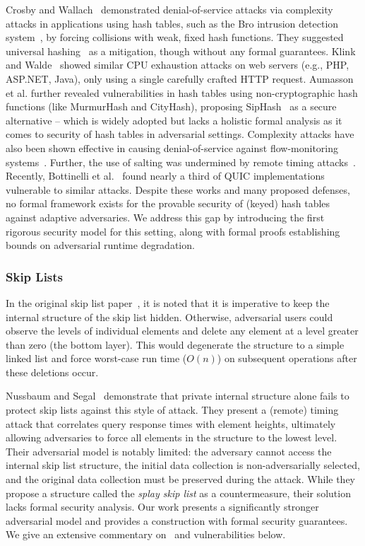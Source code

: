 Crosby and Wallach~\cite{CrosbyW03} demonstrated denial-of-service attacks via complexity attacks in applications using hash tables, such as the Bro intrusion detection system~\cite{paxson1999bro}, by forcing collisions with weak, fixed hash functions. They suggested universal hashing~\cite{carter1977universal} as a mitigation, though without any formal guarantees. Klink and Walde~\cite{klink2011efficient} showed similar CPU exhaustion attacks on web servers (e.g., PHP, ASP.NET, Java), only using a single carefully crafted HTTP request. Aumasson et al.\cite{aumasson2012hash} further revealed vulnerabilities in hash tables using non-cryptographic hash functions (like MurmurHash and CityHash\cite{appleby2016smhasher}), proposing SipHash~\cite{aumasson2012hash} as a secure alternative -- which is widely adopted but lacks a holistic formal analysis as it comes to security of hash tables in adversarial settings. Complexity attacks have also been shown effective in causing denial-of-service against flow-monitoring systems~\cite{eckhoff2009hash}. Further, the use of salting was undermined by remote timing attacks~\cite{bar2007remote}. Recently, Bottinelli et al.~\cite{bottinelli2025hash} found nearly a third of QUIC implementations vulnerable to similar attacks. Despite these works and many proposed defenses, no formal framework exists for the provable security of (keyed) hash tables against adaptive adversaries. We address this gap by introducing the first rigorous security model for this setting, along with formal proofs establishing bounds on adversarial runtime degradation.

\subsubsection{Skip Lists}
In the original skip list paper~\cite{pugh}, it is noted that it is imperative to keep the internal structure of the skip list hidden. Otherwise, adversarial users could observe the levels of individual elements and delete any element at a level greater than zero (the bottom layer). This would degenerate the structure to a simple linked list and force worst-case run time ($O(n)$) on subsequent operations after these deletions occur. 

Nussbaum and Segal~\cite{nussbaum2019skiplist} demonstrate that private internal structure alone fails to protect skip lists against this style of attack. They present a (remote) timing attack that correlates query response times with element heights, ultimately allowing adversaries to force all elements in the structure to the lowest level. Their adversarial model is notably limited: the adversary cannot access the internal skip list structure, the initial data collection is non-adversarially selected, and the original data collection must be preserved during the attack. While they propose a structure called the \emph{splay skip list} as a countermeasure, their solution lacks formal security analysis. Our work presents a significantly stronger adversarial model and provides a construction with formal security guarantees. We give an extensive commentary on~\cite{nussbaum2019skiplist} and vulnerabilities below. 

